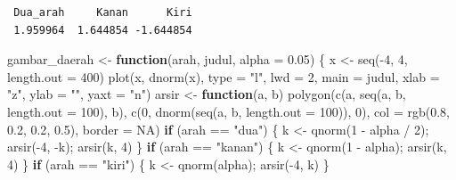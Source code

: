 \documentclass[
  indonesian,
  letterpaper,
]{book}
\newenvironment{Shaded}{\begin{snugshade}}{\end{snugshade}}
\newcommand{\AttributeTok}[1]{\textcolor[rgb]{0.40,0.45,0.13}{#1}}
\newcommand{\ConstantTok}[1]{\textcolor[rgb]{0.56,0.35,0.01}{#1}}
\newcommand{\ControlFlowTok}[1]{\textcolor[rgb]{0.00,0.23,0.31}{\textbf{#1}}}
\newcommand{\DecValTok}[1]{\textcolor[rgb]{0.68,0.00,0.00}{#1}}
\newcommand{\FloatTok}[1]{\textcolor[rgb]{0.68,0.00,0.00}{#1}}
\newcommand{\FunctionTok}[1]{\textcolor[rgb]{0.28,0.35,0.67}{#1}}
\newcommand{\NormalTok}[1]{\textcolor[rgb]{0.00,0.23,0.31}{#1}}
\newcommand{\OtherTok}[1]{\textcolor[rgb]{0.00,0.23,0.31}{#1}}
\newcommand{\SpecialCharTok}[1]{\textcolor[rgb]{0.37,0.37,0.37}{#1}}
\newcommand{\StringTok}[1]{\textcolor[rgb]{0.13,0.47,0.30}{#1}}
\begin{document}
\begin{verbatim}
 Dua_arah     Kanan      Kiri 
 1.959964  1.644854 -1.644854 
\end{verbatim}

\begin{Shaded}
\begin{Highlighting}[]
\NormalTok{gambar\_daerah }\OtherTok{\textless{}{-}} \ControlFlowTok{function}\NormalTok{(arah, judul, }\AttributeTok{alpha =} \FloatTok{0.05}\NormalTok{) \{}
\NormalTok{  x }\OtherTok{\textless{}{-}} \FunctionTok{seq}\NormalTok{(}\SpecialCharTok{{-}}\DecValTok{4}\NormalTok{, }\DecValTok{4}\NormalTok{, }\AttributeTok{length.out =} \DecValTok{400}\NormalTok{)}
  \FunctionTok{plot}\NormalTok{(x, }\FunctionTok{dnorm}\NormalTok{(x), }\AttributeTok{type =} \StringTok{"l"}\NormalTok{, }\AttributeTok{lwd =} \DecValTok{2}\NormalTok{, }\AttributeTok{main =}\NormalTok{ judul, }\AttributeTok{xlab =} \StringTok{"z"}\NormalTok{, }\AttributeTok{ylab =} \StringTok{""}\NormalTok{, }\AttributeTok{yaxt =} \StringTok{"n"}\NormalTok{)}
\NormalTok{  arsir }\OtherTok{\textless{}{-}} \ControlFlowTok{function}\NormalTok{(a, b) }\FunctionTok{polygon}\NormalTok{(}\FunctionTok{c}\NormalTok{(a, }\FunctionTok{seq}\NormalTok{(a, b, }\AttributeTok{length.out =} \DecValTok{100}\NormalTok{), b),}
                                  \FunctionTok{c}\NormalTok{(}\DecValTok{0}\NormalTok{, }\FunctionTok{dnorm}\NormalTok{(}\FunctionTok{seq}\NormalTok{(a, b, }\AttributeTok{length.out =} \DecValTok{100}\NormalTok{)), }\DecValTok{0}\NormalTok{),}
                                  \AttributeTok{col =} \FunctionTok{rgb}\NormalTok{(}\FloatTok{0.8}\NormalTok{, }\FloatTok{0.2}\NormalTok{, }\FloatTok{0.2}\NormalTok{, }\FloatTok{0.5}\NormalTok{), }\AttributeTok{border =} \ConstantTok{NA}\NormalTok{)}
  \ControlFlowTok{if}\NormalTok{ (arah }\SpecialCharTok{==} \StringTok{"dua"}\NormalTok{)   \{ k }\OtherTok{\textless{}{-}} \FunctionTok{qnorm}\NormalTok{(}\DecValTok{1} \SpecialCharTok{{-}}\NormalTok{ alpha }\SpecialCharTok{/} \DecValTok{2}\NormalTok{); }\FunctionTok{arsir}\NormalTok{(}\SpecialCharTok{{-}}\DecValTok{4}\NormalTok{, }\SpecialCharTok{{-}}\NormalTok{k); }\FunctionTok{arsir}\NormalTok{(k, }\DecValTok{4}\NormalTok{) \}}
  \ControlFlowTok{if}\NormalTok{ (arah }\SpecialCharTok{==} \StringTok{"kanan"}\NormalTok{) \{ k }\OtherTok{\textless{}{-}} \FunctionTok{qnorm}\NormalTok{(}\DecValTok{1} \SpecialCharTok{{-}}\NormalTok{ alpha); }\FunctionTok{arsir}\NormalTok{(k, }\DecValTok{4}\NormalTok{) \}}
  \ControlFlowTok{if}\NormalTok{ (arah }\SpecialCharTok{==} \StringTok{"kiri"}\NormalTok{)  \{ k }\OtherTok{\textless{}{-}} \FunctionTok{qnorm}\NormalTok{(alpha); }\FunctionTok{arsir}\NormalTok{(}\SpecialCharTok{{-}}\DecValTok{4}\NormalTok{, k) \}}

\end{Highlighting}
\end{Shaded}
\end{document}
